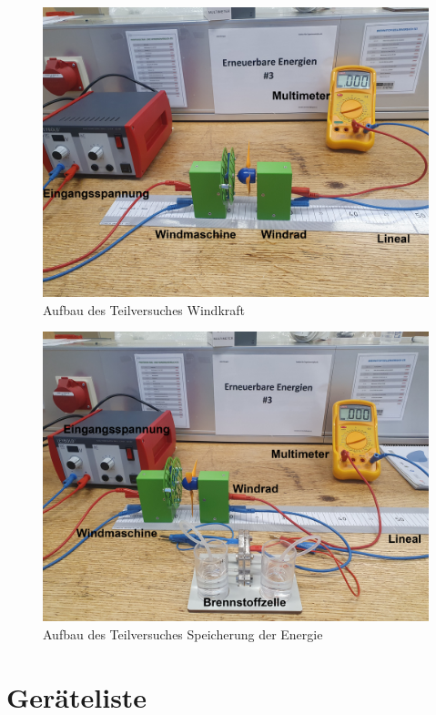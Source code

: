\documentclass[12pt,a4paper,twoside]{article}
\begin{document}
    \begin{figure}[H]
        \centering
        \includegraphics[width=0.6\linewidth]{nudes/wind aufbau.jpg}
        \caption{Aufbau des Teilversuches Windkraft}
        \label{fig:aufbau Windkraft}
    \end{figure}

    \begin{figure}[H]
        \centering
        \includegraphics[width=0.6\linewidth]{nudes/wind und brennstoff.jpg}
        \caption{Aufbau des Teilversuches Speicherung der Energie}
        \label{fig:aufbau Speicherung Energie}
    \end{figure}

\section{Geräteliste} %
\end{document}
